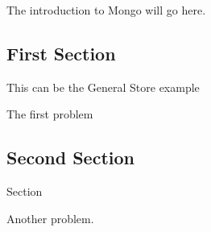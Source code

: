 
The introduction to Mongo will go here.

\subsection*{First Section}
This can be the General Store example

\begin{problem}
The first problem
\end{problem}

\subsection*{Second Section}
Section

\begin{problem}
Another problem.
\end{problem}